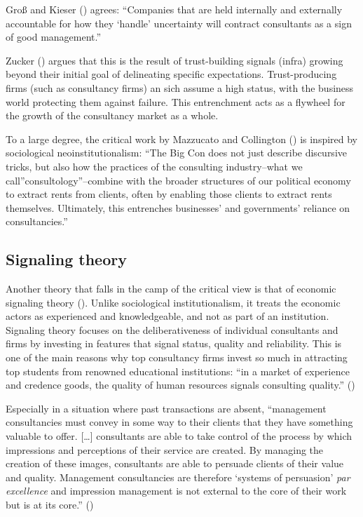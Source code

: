 \documentclass[
  man,floatsintext]{apa6}
\begin{document}
Groß and Kieser () agrees: ``Companies that are held internally and externally accountable for how they `handle' uncertainty will contract consultants as a sign of good management.''

Zucker () argues that this is the result of trust-building signals (infra) growing beyond their initial goal of delineating specific expectations. Trust-producing firms (such as consultancy firms) an sich assume a high status, with the business world protecting them against failure. This entrenchment acts as a flywheel for the growth of the consultancy market as a whole.

To a large degree, the critical work by Mazzucato and Collington () is inspired by sociological neoinstitutionalism: ``The Big Con does not just describe discursive tricks, but also how the practices of the consulting industry--what we call''consultology''--combine with the broader structures of our political economy to extract rents from clients, often by enabling those clients to extract rents themselves. Ultimately, this entrenches businesses' and governments' reliance on consultancies.''

\subsection{Signaling theory}\label{signaling-theory}

Another theory that falls in the camp of the critical view is that of economic signaling theory (). Unlike sociological institutionalism, it treats the economic actors as experienced and knowledgeable, and not as part of an institution. Signaling theory focuses on the deliberativeness of individual consultants and firms by investing in features that signal status, quality and reliability. This is one of the main reasons why top consultancy firms invest so much in attracting top students from renowned educational institutions: ``in a market of experience and credence goods, the quality of human resources signals consulting quality.'' ()

Especially in a situation where past transactions are absent, ``management consultancies must convey in some way to their clients that they have something valuable to offer. {[}\ldots{]} consultants are able to take control of the process by which impressions and perceptions of their service are created. By managing the creation of these images, consultants are able to persuade clients of their value and quality. Management consultancies are therefore `systems of persuasion' \emph{par excellence} and impression management is not external to the core of their work but is at its core.'' ()
\end{document}
